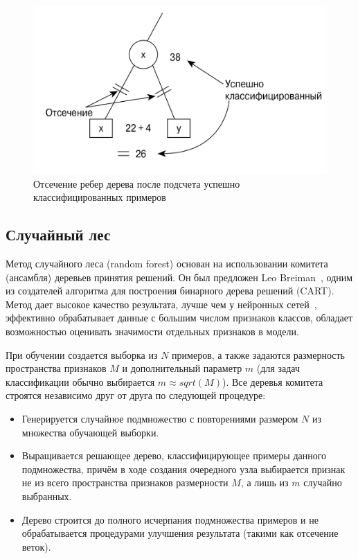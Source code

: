 \documentclass[a4paper,14pt]{extarticle} %
\begin{document}
\begin{figure}[H]
\centering
\includegraphics[width=0.85\linewidth]{amputation}
\caption{Отсечение ребер дерева после подсчета успешно классифицированных примеров}
\label{fig:amputation}
\end{figure}

\subsection{Случайный лес}
\hspace{\parindent} Метод случайного леса (random forest) основан на использовании комитета (ансамбля) деревьев принятия решений. Он был предложен Leo Breiman~\cite{breiman2001random}, одним из создателей алгоритма  для построения бинарного дерева решений (CART). Метод дает высокое качество результата, лучше чем у нейронных сетей~\cite{niculescu2005empirical}, эффективно обрабатывает данные с большим числом признаков классов, обладает возможностью оценивать значимости отдельных признаков в модели.

При обучении создается выборка из $N$ примеров, а также задаются размерность пространства признаков $M$ и дополнительный параметр $m$ (для задач классификации обычно выбирается $m \approx sqrt(M)$). Все деревья комитета строятся независимо друг от друга по следующей процедуре:
\begin{itemize}
\item Генерируется случайное подмножество с повторениями размером $N$ из множества обучающей выборки.
\item Выращивается решающее дерево, классифицирующее примеры данного подмножества, причём в ходе создания очередного узла выбирается признак не из всего пространства признаков размерности $M$, а лишь из $m$ случайно выбранных. 
\item Дерево строится до полного исчерпания подмножества примеров и не обрабатывается процедурами улучшения результата (такими как отсечение веток).
\end{itemize}
\end{document}
